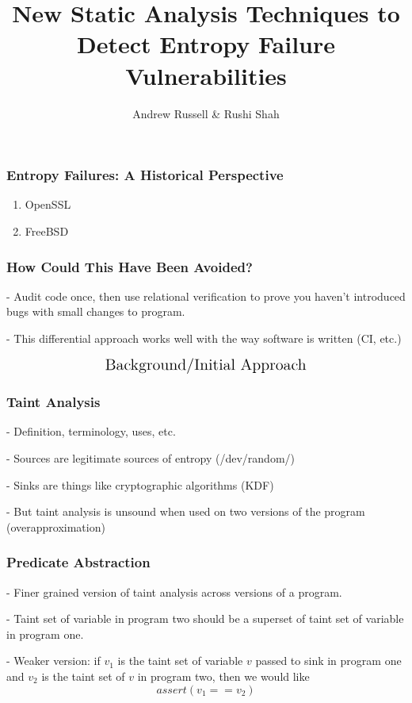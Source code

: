 \documentclass{beamer} %
\title{New Static Analysis Techniques to Detect Entropy Failure Vulnerabilities}
\author{Andrew Russell \& Rushi Shah}
\institute{The University of Texas at Austin}
\theoremstyle{definition} %
\begin{document}
\begin{frame}
\titlepage
\end{frame}

\begin{frame}
\frametitle{Entropy Failures: A Historical Perspective}

	\begin{center}
	\Large{
	\begin{enumerate}
		\item OpenSSL
		\item FreeBSD
	\end{enumerate}
	}
	\end{center}

\end{frame}

\begin{frame}
\frametitle{How Could This Have Been Avoided?}

	- Audit code once, then use relational verification to prove you haven't introduced bugs with small changes to program. 

	- This differential approach works well with the way software is written (CI, etc.)

\end{frame}

\begin{frame}
	\[\text{\Large{Background/Initial Approach}}\]
\end{frame}

\begin{frame}
\frametitle{Taint Analysis}

	- Definition, terminology, uses, etc.

	- Sources are legitimate sources of entropy (/dev/random/)

	- Sinks are things like cryptographic algorithms (KDF)

	- But taint analysis is unsound when used on two versions of the program (overapproximation)

\end{frame}

\begin{frame}
\frametitle{Predicate Abstraction}

	- Finer grained version of taint analysis across versions of a program.

	- Taint set of variable in program two should be a superset of taint set of variable in program one.

	\pause

	- Weaker version: if $v_1$ is the taint set of variable $v$ passed to sink in program one and $v_2$ is the taint set of $v$ in program two, then we would like \[assert(v_1 == v_2)\]

\end{frame}
\end{document}
